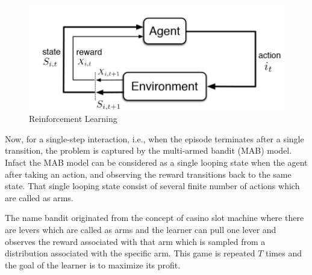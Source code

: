\begin{figure}[!th]
\begin{center}
\includegraphics[scale=0.3]{synopsis/img/RL1.png}
\caption{Reinforcement Learning}
\label{fig:rl}
\end{center}
\end{figure}

Now, for a single-step interaction, i.e., when the episode terminates after a single transition, the problem is captured by the multi-armed bandit (MAB) model. Infact the MAB model can be considered as a single looping state when the agent after taking an action, and observing the reward transitions back to the same state. That single looping state consist of several finite number of actions which are called as arms.

	The name bandit originated from the concept of casino slot machine where there are levers which are called as arms and the learner can pull one lever and observes the reward associated with that arm which is sampled from a distribution associated with the specific arm. This game is repeated $T$ times and the goal of the learner is to maximize its profit. 
    
    

